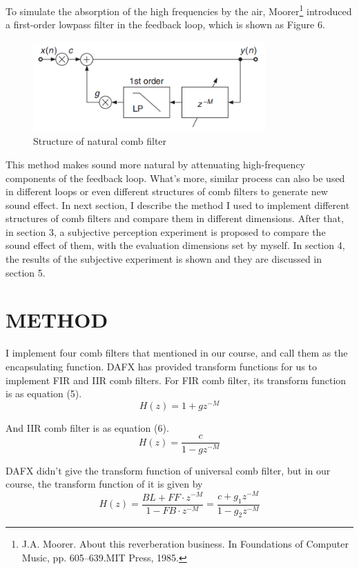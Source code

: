 \documentclass[a4paper]{tufte-handout} %
\begin{document}
To simulate the absorption of the high frequencies by the air, Moorer\footnote{J.A. Moorer. About this reverberation business. In Foundations of Computer Music, pp. 605–639.MIT Press, 1985.} introduced a first-order lowpass filter in the feedback loop, which is shown as Figure 6.
\begin{figure}[h]
    \centering
	\includegraphics[width=3.5in]{Image/NaturalComb.png}
	\caption{Structure of natural comb filter}
	\label{fig:textfig}
\end{figure}

This method makes sound more natural by attenuating high-frequency components of the feedback loop. What's more, similar process can also be used in different loops or even different structures of comb filters to generate new sound effect. In next section, I describe the method I used to implement different structures of comb filters and compare them in different dimensions. After that, in section 3, a subjective perception experiment is proposed to compare the sound effect of them, with the evaluation dimensions set by myself. In section 4, the results of the subjective experiment is shown and they are discussed in section 5.

\section{METHOD}
I implement four comb filters that mentioned in our course, and call them as the encapsulating function. DAFX has provided transform functions for us to implement FIR and IIR comb filters. For FIR comb filter, its transform function is as equation (5).
\begin{equation}
H(z)=1+gz^{-M}
\end{equation}

And IIR comb filter is as equation (6).
\begin{equation}
H(z)=\frac{c}{1-gz^{-M}}
\end{equation}

DAFX didn't give the transform function of universal comb filter, but in our course, the transform function of it is given by
\begin{equation}
H(z)=\frac{BL+FF \cdot z^{-M}}{1-FB \cdot z^{-M}} = \frac{c+g_1z^{-M}}{1-g_2z^{-M}}
\end{equation}
\end{document}
